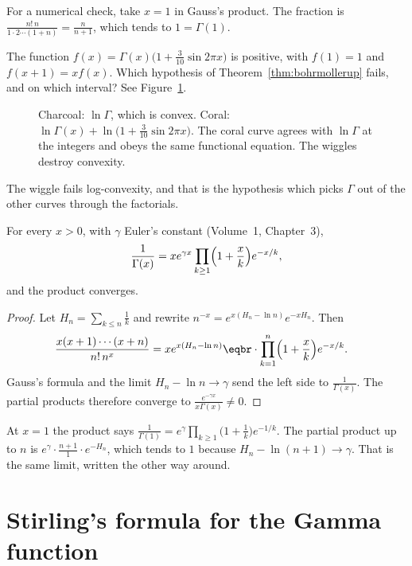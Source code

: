 For a numerical check, take $x=1$ in Gauss's product. The fraction is $\frac{n!\,n}{1\cdot2\cdots(1+n)}=\frac{n}{n+1}$, which tends to $1=\Gamma(1)$.

\begin{think}
The function $f(x)=\Gamma(x)\bigl(1+\frac3{10}\sin2\pi x\bigr)$ is positive, with $f(1)=1$ and $f(x+1)=xf(x)$. Which hypothesis of Theorem~\ref{thm:bohrmollerup} fails, and on which interval? See Figure~\ref{fig:loggamma}.
\end{think}

\begin{figure}[ht]
\centering
{}
\caption{Charcoal: $\ln\Gamma$, which is convex. Coral: $\ln\Gamma(x)+\ln\bigl(1+\frac3{10}\sin2\pi x\bigr)$. The coral curve agrees with $\ln\Gamma$ at the integers and obeys the same functional equation. The wiggles destroy convexity.}
\label{fig:loggamma}
\end{figure}

The wiggle fails log-convexity, and that is the hypothesis which picks $\Gamma$ out of the other curves through the factorials.

\begin{corollary}\label{cor:weierstrass}
For every $x>0$, with $\gamma$ Euler's constant (Volume~1, Chapter~3),
\[
\frac1{\Gamma(x)}=xe^{\gamma x}\prod_{k\ge1}\Bigl(1+\frac xk\Bigr)e^{-x/k},
\]
and the product converges.
\end{corollary}
\begin{proof}
Let $H_n=\sum_{k\le n}\frac1k$ and rewrite $n^{-x}=e^{x(H_n-\ln n)}e^{-xH_n}$. Then
\[
\begin{aligned}\frac{x(x+1)\cdots(x+n)}{n!\,n^x}&=xe^{x(H_n-\ln n)}\eqbr\cdot\prod_{k=1}^n\Bigl(1+\frac xk\Bigr)e^{-x/k}.\end{aligned}
\]
Gauss's formula and the limit $H_n-\ln n\to\gamma$ send the left side to $\frac1{\Gamma(x)}$. The partial products therefore converge to $\frac{e^{-\gamma x}}{x\Gamma(x)}\ne0$.
\end{proof}

At $x=1$ the product says $\frac1{\Gamma(1)}=e^{\gamma}\prod_{k\ge1}\bigl(1+\frac1k\bigr)e^{-1/k}$. The partial product up to $n$ is $e^{\gamma}\cdot\frac{n+1}1\cdot e^{-H_n}$, which tends to $1$ because $H_n-\ln(n+1)\to\gamma$. That is the same limit, written the other way around.

\section{Stirling's formula for the Gamma function}

